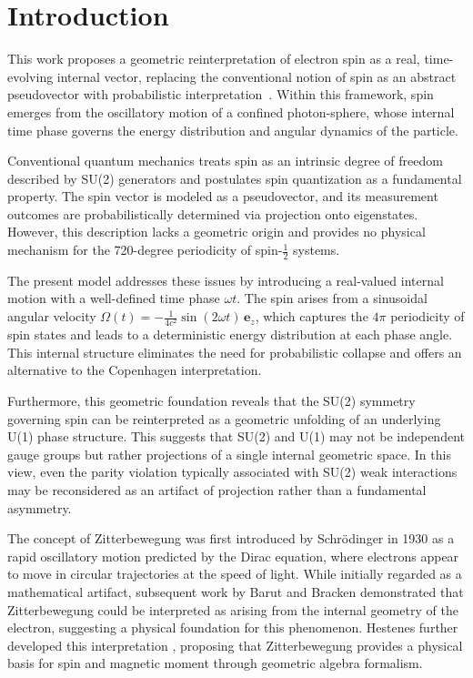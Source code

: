 \documentclass[%
 reprint,
 amsmath,amssymb,
 aps,
]{revtex4-1}
\numberwithin{equation}{section}%
\begin{document}
\maketitle

\section{Introduction}

This work proposes a geometric reinterpretation of electron spin as a real, time-evolving internal vector, replacing the conventional notion of spin as an abstract pseudovector with probabilistic interpretation~\cite{uhlenbeck1925}. Within this framework, spin emerges from the oscillatory motion of a confined photon-sphere, whose internal time phase governs the energy distribution and angular dynamics of the particle.

Conventional quantum mechanics treats spin as an intrinsic degree of freedom described by SU(2) generators and postulates spin quantization as a fundamental property. The spin vector is modeled as a pseudovector, and its measurement outcomes are probabilistically determined via projection onto eigenstates. However, this description lacks a geometric origin and provides no physical mechanism for the 720-degree periodicity of spin-$\frac{1}{2}$ systems.

The present model addresses these issues by introducing a real-valued internal motion with a well-defined time phase $\omega t$. The spin arises from a sinusoidal angular velocity $\Omega(t) = -\frac{1}{4c^2} \sin(2\omega t) \, \mathbf{e}_z$, which captures the $4\pi$ periodicity of spin states and leads to a deterministic energy distribution at each phase angle. This internal structure eliminates the need for probabilistic collapse and offers an alternative to the Copenhagen interpretation.

Furthermore, this geometric foundation reveals that the SU(2) symmetry governing spin can be reinterpreted as a geometric unfolding of an underlying U(1) phase structure. This suggests that SU(2) and U(1) may not be independent gauge groups but rather projections of a single internal geometric space. In this view, even the parity violation typically associated with SU(2) weak interactions may be reconsidered as an artifact of projection rather than a fundamental asymmetry.

The concept of Zitterbewegung was first introduced by Schrödinger in 1930 \cite{schrodinger1930} as a rapid oscillatory motion predicted by the Dirac equation, where electrons appear to move in circular trajectories at the speed of light. While initially regarded as a mathematical artifact, subsequent work by Barut and Bracken \cite{barut1981} demonstrated that Zitterbewegung could be interpreted as arising from the internal geometry of the electron, suggesting a physical foundation for this phenomenon. Hestenes further developed this interpretation \cite{hestenes1990}, proposing that Zitterbewegung provides a physical basis for spin and magnetic moment through geometric algebra formalism.
\end{document}
